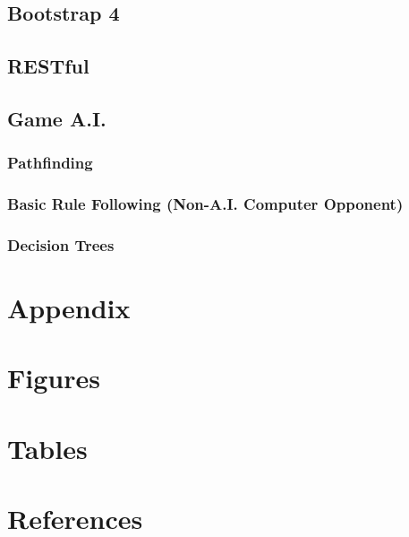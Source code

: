 \documentclass[12pt,a4paper]{report}
\begin{document}
	\section{Bootstrap 4}
		
	\section{RESTful}
	\section{Game A.I.}
		\subsection{Pathfinding}
		\subsection{Basic Rule Following (Non-A.I. Computer Opponent)}
		\subsection{Decision Trees}

\newpage
\chapter*{Appendix}

\newpage
\chapter*{Figures}

\newpage
\chapter*{Tables}

\newpage
\chapter*{References}
	
\end{document}
